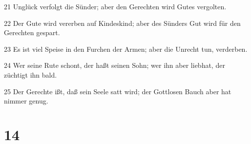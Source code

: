 \par 21 Unglück verfolgt die Sünder; aber den Gerechten wird Gutes vergolten.
\par 22 Der Gute wird vererben auf Kindeskind; aber des Sünders Gut wird für den Gerechten gespart.
\par 23 Es ist viel Speise in den Furchen der Armen; aber die Unrecht tun, verderben.
\par 24 Wer seine Rute schont, der haßt seinen Sohn; wer ihn aber liebhat, der züchtigt ihn bald.
\par 25 Der Gerechte ißt, daß sein Seele satt wird; der Gottlosen Bauch aber hat nimmer genug.

\chapter{14}

